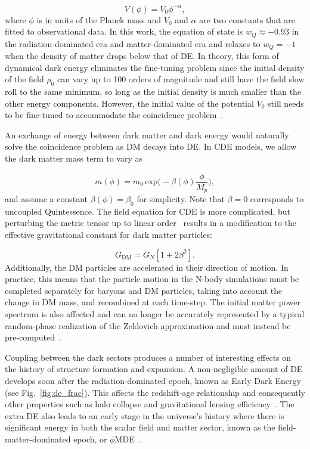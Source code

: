 \documentclass[a4paper,fleqn,usenatbib]{mnras}
\begin{document}
\begin{equation}
V(\phi) = V_0 \phi^{-\alpha},
\end{equation}
where $\phi$ is in units of the Planck mass and $V_0$ and $\alpha$ are two constants that are fitted to observational data. In this work, the equation of state is $w_Q \approx -0.93$ in the radiation-dominated era and matter-dominated era and relaxes to $w_Q = -1$ when the density of matter drops below that of DE. In theory, this form of dynamical dark energy eliminates the fine-tuning problem since the initial density of the field $\rho_0$ can vary up to 100 orders of magnitude and still have the field slow roll to the same minimum, so long as the initial density is much smaller than the other energy components. However, the initial value of the potential $V_0$ still needs to be fine-tuned to accommodate the coincidence problem~\citep{2012IJMPD..2130002Y}.

An exchange of energy between dark matter and dark energy would naturally solve the coincidence problem as DM decays into DE. In CDE models, we allow the dark matter mass term to vary as

\begin{equation}
\label{eq:mass}
m(\phi) = m_0 \, \mathrm{exp} \Big( - \beta(\phi) \frac{\phi}{M_p} \Big),
\end{equation}
and assume a constant $\beta(\phi)=\beta_0$ for simplicity. Note that $\beta=0$ corresponds to uncoupled Quintessence.
The field equation for CDE is more complicated, but perturbing the metric tensor up to linear order~\citep{2010MNRAS.403.1684B} results in a modification to the effective gravitational constant for dark matter particles:

\begin{equation}
\label{eq:gravcon}
G_{\mathrm{DM}} = G_N [1 + 2\beta^2].
\end{equation}
Additionally, the DM particles are accelerated in their direction of motion. In practice, this means that the particle motion in the N-body simulations must be completed separately for baryons and DM particles, taking into account the change in DM mass, and recombined at each time-step. The initial matter power spectrum is also affected and can no longer be accurately represented by a typical random-phase realization of the Zel\textquotesingle dovich approximation and must instead be pre-computed~\citep{2014MNRAS.439.2943C}.  

Coupling between the dark sectors produces a number of interesting effects on the history of structure formation and expansion. A non-negligible amount of DE develops soon after the radiation-dominated epoch, known as Early Dark Energy (see Fig.~\ref{fig:de_frac}). This affects the redshift-age relationship and consequently other properties such as halo collapse and gravitational lensing efficiency~\citep{2006A&A...454...27B}. The extra DE also leads to an early stage in the universe's history where there is significant energy in both the scalar field and matter sector, known as the field-matter-dominated epoch, or $\phi$MDE~\citep{2000PhRvD..62d3511A}.
\end{document}
